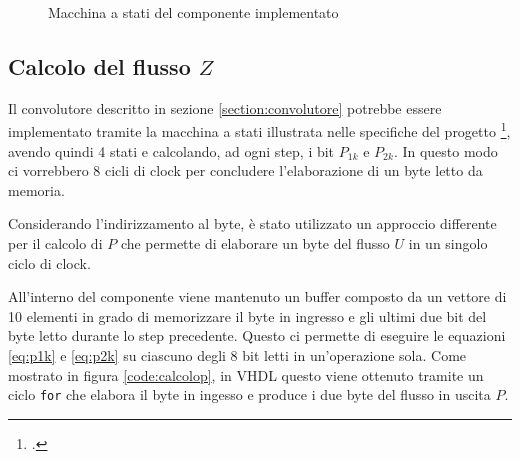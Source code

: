 \begin{figure}[!ht]
    \centering
    \caption{Macchina a stati del componente implementato}
    \label{fig:statemachine}
\end{figure}

\subsection{Calcolo del flusso \texorpdfstring{$Z$}{}}
\label{section:calcolodiz}

Il convolutore descritto in sezione \ref{section:convolutore} potrebbe essere implementato tramite la macchina a stati illustrata nelle specifiche del progetto \footcite{specifichedelprogetto}, avendo quindi 4 stati e calcolando, ad ogni step, i bit $P_{1k}$ e $P_{2k}$. In questo modo ci vorrebbero 8 cicli di clock per concludere l'elaborazione di un byte letto da memoria.

Considerando l'indirizzamento al byte, è stato utilizzato un approccio differente per il calcolo di $P$ che permette di elaborare un byte del flusso $U$ in un singolo ciclo di clock.

All'interno del componente viene mantenuto un buffer composto da un vettore di 10 elementi in grado di memorizzare il byte in ingresso e gli ultimi due bit del byte letto durante lo step precedente. Questo ci permette di eseguire le equazioni \ref{eq:p1k} e \ref{eq:p2k} su ciascuno degli 8 bit letti in un'operazione sola. Come mostrato in figura \ref{code:calcolop}, in VHDL questo viene ottenuto tramite un ciclo \verb|for| che elabora il byte in ingesso e produce i due byte del flusso in uscita $P$.

